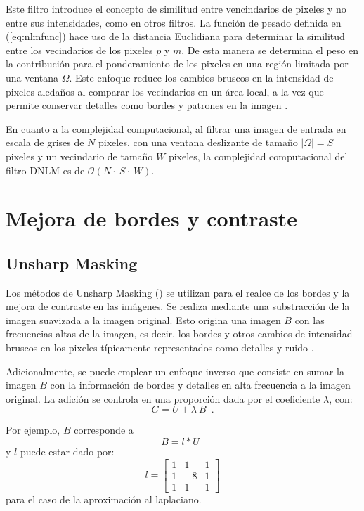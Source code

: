 Este filtro introduce el concepto de similitud entre vencindarios de pixeles y no entre sus intensidades, como en otros filtros. La función de pesado definida en (\ref{eq:nlmfunc}) hace uso de la distancia Euclidiana para determinar la similitud entre los vecindarios de los pixeles $p$ y $m$. 
De esta manera se determina el peso en la contribución para el ponderamiento de los pixeles en una región limitada por una ventana $\Omega$. Este enfoque reduce los cambios bruscos en la intensidad de pixeles aleda\~nos al comparar los vecindarios en un \'area local, a la vez que permite conservar detalles como bordes y patrones en la imagen \cite{calderon2015dewaff}. 


En cuanto a la complejidad computacional, al filtrar una imagen de entrada en escala de grises de $N$ pixeles, con una ventana deslizante de tama\~no $|\Omega| = S$ pixeles y un vecindario de tama\~no $W$ pixeles, la complejidad computacional del filtro DNLM es de $\mathcal{O}(N\cdot~S\cdot~W)$. 



\section{Mejora de bordes y contraste}

\subsection{Unsharp Masking}
\label{ch:marco_usm}

Los métodos de Unsharp Masking () se utilizan para el realce de los bordes y la mejora de contraste en las im\'agenes. Se realiza mediante una substracción de la imagen suavizada a la imagen original. Esto origina una imagen $B$ con las frecuencias altas de la imagen, es decir, los bordes y otros cambios de intensidad bruscos en los pixeles típicamente representados como detalles y ruido \cite{worksunsharp}. 

Adicionalmente, se puede emplear un enfoque inverso que consiste en sumar la imagen $B$ con la información de bordes y detalles en alta frecuencia a la imagen original. La adición se controla en una proporción dada por el coeficiente $\lambda$, con:
%
\begin{equation}
\label{eq:unsharpmask}
G=U+\lambda~B \enspace .
\end{equation}

Por ejemplo, $B$ corresponde a
%
\begin{equation}
\label{eq:unsharfilter}
B=l*U \enspace 
\end{equation}
%
y $l$ puede estar dado por:
%
\begin{equation} l = \left[
\begin{array}{ccc}
1 & 1 & 1\\
1 & -8 & 1\\
1 & 1 & 1
\end{array}\right]
\end{equation}
%
para el caso de la aproximación al laplaciano.

